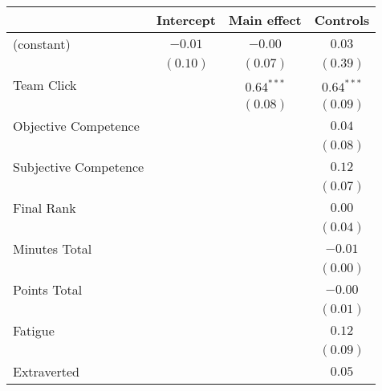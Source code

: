 
\begin{table}
\begin{center}
\begin{tabular}{l c c c }
\toprule
 & Intercept & Main effect & Controls \\
\midrule
(constant)                            & $-0.01$  & $-0.00$               & $0.03$                \\
                                      & $(0.10)$ & $(0.07)$              & $(0.39)$              \\
Team Click                            &          & $\mathbf{0.64}^{***}$ & $\mathbf{0.64}^{***}$ \\
                                      &          & $(0.08)$              & $(0.09)$              \\
Objective Competence                  &          &                       & $0.04$                \\
                                      &          &                       & $(0.08)$              \\
Subjective Competence                 &          &                       & $0.12$                \\
                                      &          &                       & $(0.07)$              \\
Final Rank                            &          &                       & $0.00$                \\
                                      &          &                       & $(0.04)$              \\
Minutes Total                         &          &                       & $-0.01$               \\
                                      &          &                       & $(0.00)$              \\
Points Total                          &          &                       & $-0.00$               \\
                                      &          &                       & $(0.01)$              \\
Fatigue                               &          &                       & $0.12$                \\
                                      &          &                       & $(0.09)$              \\
Extraverted                           &          &                       & $0.05$                \\

\end{tabular}
\end{center}
\end{table}
